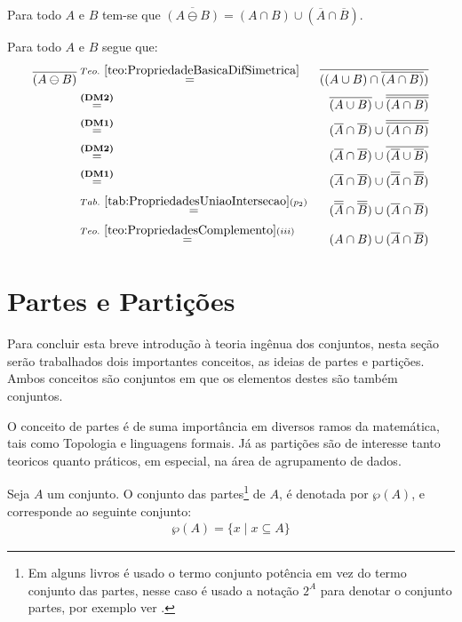\begin{teorema}
	Para todo $A$ e $B$ tem-se que $\overline{(A \ominus B)} = (A \cap B) \cup (\overline{A} \cap \overline{B})$.
\end{teorema}

\begin{prova}
	Para todo $A$ e $B$ segue que:
	\begin{eqnarray*}
		\overline{(A \ominus B)} & \stackrel{Teo. \ \ref{teo:PropriedadeBasicaDifSimetrica}}{=} & \overline{((A \cup B) \cap \overline{(A \cap B)})}\\
		& \stackrel{\textbf{(DM2)}}{=}& \overline{(A \cup B)} \cup \overline{\overline{(A \cap B)}}\\
		& \stackrel{\textbf{(DM1)}}{=}& (\overline{A} \cap \overline{B}) \cup \overline{\overline{(A \cap B)}}\\
		& \stackrel{\textbf{(DM2)}}{=}& (\overline{A} \cap \overline{B}) \cup \overline{(\overline{A} \cup \overline{B})}\\
		& \stackrel{\textbf{(DM1)}}{=}& (\overline{A} \cap \overline{B}) \cup (\overline{\overline{A}} \cap \overline{\overline{B}})\\
		& \stackrel{Tab. \ \ref{tab:PropriedadesUniaoIntersecao}(p_2)}{=}& (\overline{\overline{A}} \cap \overline{\overline{B}}) \cup (\overline{A} \cap \overline{B})\\
		& \stackrel{Teo. \ \ref{teo:PropriedadesComplemento}(iii)}{=}& (A \cap B) \cup (\overline{A} \cap \overline{B})
	\end{eqnarray*}
\end{prova}

\section{Partes e Partições}\label{sec:PartesParticoes}

Para concluir esta breve introdução à teoria ingênua dos conjuntos, nesta seção serão trabalhados dois importantes conceitos, as ideias de partes e partições. Ambos conceitos são conjuntos em que os elementos destes são também conjuntos. 

O conceito de partes é de suma importância em diversos ramos da matemática, tais como Topologia\cite{lipschutz1971-Topo} e linguagens formais\cite{linz2006, benjaLivro2010}. Já as partições são de interesse tanto teoricos\cite{carmo2013,halmos2001} quanto práticos, em especial, na área de agrupamento de dados\cite{celebi2014, fern2004}.

\begin{definicao}\label{def:ConjuntoDasPartes}
	Seja $A$ um conjunto. O conjunto das partes\footnote{Em alguns livros é usado o termo conjunto potência em vez do termo conjunto das partes, nesse caso é usado a notação $2^A$ para denotar o conjunto partes, por exemplo ver \cite{lipschutz2013-MD}.} de $A$, é denotada por $\wp(A)$, e corresponde ao seguinte conjunto:
  \begin{eqnarray*}
    \wp(A) = \{x \mid x \subseteq A\}
  \end{eqnarray*}
\end{definicao}


